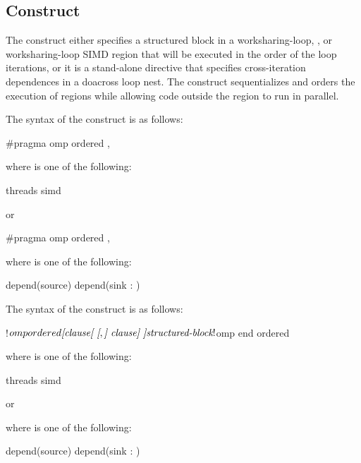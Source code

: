 \subsection{ Construct}
\label{subsec:ordered Construct}
\summary
The  construct either specifies a structured block in a
worksharing-loop, , or worksharing-loop SIMD region that will be executed in the order of the
loop iterations, or it is a stand-alone directive that specifies
cross-iteration dependences in a doacross loop nest. The 
construct sequentializes and orders the execution of  regions
while allowing code outside the region to run in parallel.

\begin{samepage}
\syntax
\begin{ccppspecific}
The syntax of the  construct is as follows:

\begin{ompcPragma}
#pragma omp ordered \plc{[clause[ [},\plc{] clause] ]} 
\end{ompcPragma}

where  is one of the following:
\begin{indentedcodelist}
threads
simd
\end{indentedcodelist}

or

\begin{ompcPragma}
#pragma omp ordered \plc{clause [[[},\plc{] clause] ... ]} 
\end{ompcPragma}
where  is one of the following:
\begin{indentedcodelist}
depend(source)
depend(sink : )
\end{indentedcodelist}


\end{ccppspecific}
\end{samepage}

\begin{fortranspecific}
The syntax of the  construct is as follows:

\begin{ompfPragma}
!$omp ordered \plc{[clause[ [},\plc{] clause] ]}
    \plc{structured-block}
!$omp end ordered
\end{ompfPragma}

where  is one of the following:
\begin{indentedcodelist}
threads
simd
\end{indentedcodelist}

or


where  is one of the following:
\begin{indentedcodelist}
depend(source)
depend(sink : )
\end{indentedcodelist}
\end{fortranspecific}

